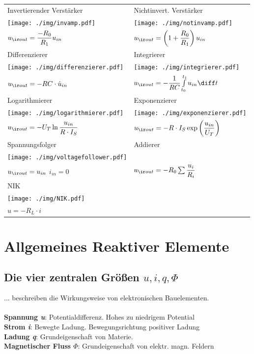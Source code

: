 \documentclass[fs, footer]{latex4ei}
\begin{document}
\begin{multicols*}{4}
		\begin{tabular}{ll}
			Invertierender Verstärker & Nichtinvert. Verstärker \\
			\texttt{[image: ./img/invamp.pdf]} & \texttt{[image: ./img/notinvamp.pdf]} \\
			$u_{\ir out} = \frac{-R_0}{R_1} u_{in}$ & $u_{\ir out} = \left( 1+ \frac{R_0}{R_1} \right) u_{in}$ \\[0.5em] \mrule
			Differenzierer & Integrierer \\
			\texttt{[image: ./img/differenzierer.pdf]} & \texttt{[image: ./img/integrierer.pdf]}\\
			$u_{\ir out} = -RC \cdot \dot u_{in}$ & $u_{\ir out} = -\frac{1}{RC} \int\limits^{t_1}_{t_0} u_{in} \diff t$\\ \mrule
			Logarithmierer & Exponenzierer \\
			\texttt{[image: ./img/logarithmierer.pdf]} & \texttt{[image: ./img/exponenzierer.pdf]}\\
			$u_{\ir out} = -U_T \ln \frac{u_{in}}{R \cdot I_S}$ & $u_{\ir out} = -R \cdot I_S \exp \left( \frac{u_{in}}{U_T} \right)$\\ \mrule
			Spannungsfolger & Addierer\\
		\texttt{[image: ./img/voltagefollower.pdf]} & \\
		$u_{\ir out} = u_{in}$ \quad $i_{in} = 0$ & $u_{\ir out} = -R_0 \sum \frac{u_i}{R_i}$\\ \mrule
		NIK & \\
		\texttt{[image: ./img/NIK.pdf]} & \\
		$u = -R_L \cdot i$ \\

		\end{tabular}


\section{Allgemeines Reaktiver Elemente}

	\subsection{Die vier zentralen Größen $u,i,q,\Phi$}
	... beschreiben die Wirkungsweise von elektronischen Bauelementen.\\ \\
	\textbf{Spannung \textit{u}}: Potentialdifferenz. Hohes zu niedrigem Potential\\
	\textbf{Strom \textit{i}}: Bewegte Ladung. Bewegungsrichtung positiver Ladung\\
	\textbf{Ladung \textit{q}}: Grundeigenschaft von Materie.\\
	\textbf{Magnetischer Fluss \textit{$\Phi$}}: Grundeigenschaft von elektr. magn. Feldern\\

\end{multicols*}
\end{document}
